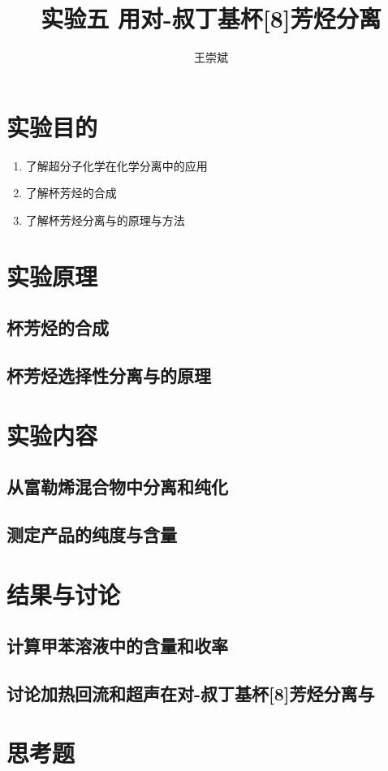\documentclass[a4paper,zihao=5,UTF8]{ctexart}
\title{\textbf{实验五 用对-叔丁基杯[8]芳烃分离\ce{C_{60}}\cite{inorganic_chemistry_1}}}
\author{王崇斌\;1800011716}
\begin{document}
	\pagestyle{fancy}
	\pagestyle{fancy}
	\chead{}
	\rhead{\today}
	\maketitle
    \thispagestyle{fancy}
    \section{实验目的}
    \begin{enumerate}
        \item 了解超分子化学在化学分离中的应用
        \item 了解杯芳烃的合成
        \item 了解杯芳烃分离与的原理与方法
    \end{enumerate}
	\section{实验原理}
    \subsection{杯芳烃的合成}
    \subsection{杯芳烃选择性分离与的原理}
    \section{实验内容}

    \subsection{从富勒烯混合物中分离和纯化}
    \subsection{测定产品的纯度与含量}
    \section{结果与讨论}
    \subsection{计算甲苯溶液中的含量和收率}
    \subsection{讨论加热回流和超声在对-叔丁基杯[8]芳烃分离与
    }
    \section{思考题}

    
	
\end{document}
